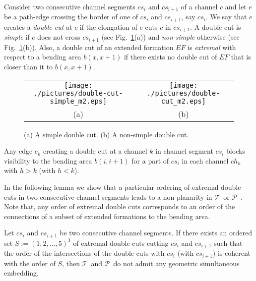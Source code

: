 \documentclass[a4paper,10pt]{llncs}
\newcounter{prop}
\newcommand{\T}{\mbox{$\mathcal T$ }}
\renewcommand{\P}{\mbox{$\mathcal P$ }}
\begin{document}
Consider two consecutive channel segments $cs_i$ and $cs_{i+1}$ of a channel $c$ and let $e$ be a path-edge crossing the border of one of $cs_i$ and $cs_{i+1}$, say $cs_i$. We say that $e$ creates a \emph{double cut} at $c$ if the elongation of $e$ cuts $c$ in $cs_{i+1}$. A double cut is \emph{simple} if $e$ does not cross $cs_{i+1}$ (see Fig.~\ref{fig:double-cut}(a)) and \emph{non-simple} otherwise (see Fig.~\ref{fig:double-cut}(b)). Also, a double cut of an extended formation $EF$ is \emph{extremal} with respect to a bending area $b(x,x+1)$ if there exists no double cut of $EF$ that is closer than it to $b(x,x+1)$.

\begin{figure}[htb]
\begin{center}
\begin{tabular}{c c}
\mbox{\texttt{[image: ./pictures/double-cut-simple\_m2.eps]}} \hspace{1.5cm} &
\mbox{\texttt{[image: ./pictures/double-cut\_m2.eps]}} \\
(a) \hspace{1.5cm} & (b)\\
\end{tabular}
\caption{(a) A simple double cut. (b) A non-simple double cut.}
\label{fig:double-cut}
\end{center}
\end{figure}

\begin{property}\label{prop:double-cut}
Any edge $e_k$ creating a double cut at a channel $k$ in channel segment $cs_i$ blocks visibility to the bending area $b(i,i+1)$ for a part of $cs_i$ in each channel $ch_h$ with $h>k$ (with $h<k$).
\end{property}

In the following lemma we show that a particular ordering of extremal double cuts in two consecutive channel segments leads to a non-planarity in \T or \P. Note that, any order of extremal double cuts corresponds to an order of the connections of a subset of extended formations to the bending area.

\begin{lemma}\label{lemma:no-ordered-double-cuts}
Let $cs_i$ and $cs_{i+1}$ be two consecutive channel segments. If there exists an ordered set $S:=(1,2,\ldots ,5)^3$ of extremal double cuts cutting $cs_i$ and $cs_{i+1}$ such that the order of the intersections of the double cuts with $cs_i$ (with $cs_{i+1}$) is coherent with the order of $S$, then \T and \P do not admit any geometric simultaneous embedding.
\end{lemma}
\end{document}
